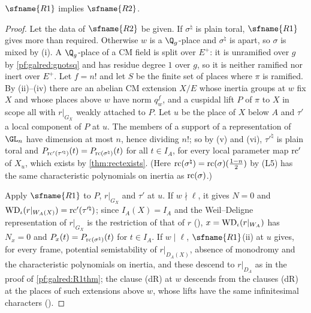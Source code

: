 \begin{theorem}\label{pf:galred:R2thm}
$\sfname{R1}$ implies $\sfname{R2}$.
\end{theorem}

\begin{proof}
Let the data of $\sfname{R2}$ be given. If $\sigma^\natural$ is plain toral, $\sfname{R1}$ gives more than required.
Otherwise $w$ is a $\Q_g$-place and $\sigma^\natural$ is apart, so $\sigma$ is mixed by (i). A $\Q_g$-place of a CM field
is split over $E^+$: it is unramified over $g$ by \cref{pf:galred:gnotsq} and has residue degree $1$ over $g$, so it is
neither ramified nor inert over $E^+$. Let $f=n!$ and let $S$ be the
finite set of places where $\pi$ is ramified. By (ii)--(iv) there are an abelian CM extension $X/E$ whose inertia
groups at $w$ fix $X$ and whose places above $w$ have norm $q_w^f$, and a cuspidal lift $P$ of $\pi$ to $X$ in scope
$\mathrm{all}$ with $r|_{G_X}$ weakly attached to $P$. Let $u$ be the place of $X$ below $A$ and $\tau'$ a local component
of $P$ at $u$. The members of a support of a representation of $\GL_n$ have dimension at most $n$, hence dividing $n!$;
so by (v) and (vi), $\tau'^\natural$ is plain toral and $P_{\mathrm{rc}'(\tau'^\natural)}(t)=P_{\mathrm{rc}(\sigma^\natural)}(t)$ for all
$t\in I_A$, for every local parameter map $\mathrm{rc}'$ of $X_u$, which exists by \cref{thm:rectexists}. (Here
$\mathrm{rc}(\sigma^\natural)=\mathrm{rc}(\sigma)(\frac{1-n}2)$ by (L5) has the same characteristic polynomials on inertia as
$\mathrm{rc}(\sigma)$.)

Apply $\sfname{R1}$ to $P$, $r|_{G_X}$ and $\tau'$ at $u$. If $w\nmid\ell$, it gives $N=0$ and
$\mathrm{WD}_\iota(r|_{W_A(X)})=\mathrm{rc}'(\tau'^\natural)$; since $I_A(X)=I_A$ and the Weil--Deligne representation of
$r|_{G_X}$ is the restriction of that of $r$ (), $x=\mathrm{WD}_\iota(r|_{W_A})$
has $N_x=0$ and $P_x(t)=P_{\mathrm{rc}(\sigma^\natural)}(t)$ for $t\in I_A$. If $w\mid\ell$, $\sfname{R1}$(ii) at $u$ gives, for
every frame, potential semistability of $r|_{D_A(X)}$, absence of monodromy and the characteristic polynomials on
inertia, and these descend to $r|_{D_A}$ as in the proof of \cref{pf:galred:R1thm}; the clause (dR) at $w$ descends from
the clauses (dR) at the places of such extensions above $w$, whose lifts have the same infinitesimal characters
().
\end{proof}

